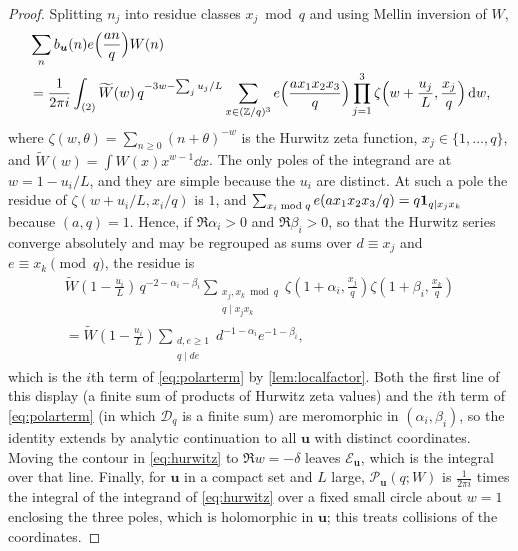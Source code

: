 \documentclass[11pt,colorlinks]{charlie}
\begin{document}
\begin{proof}
Splitting $n_j$ into residue classes $x_j\bmod q$ and using Mellin inversion of $W$,
\begin{equation}\label{eq:hurwitz}
 \begin{split}
 &\sum_nb_{\boldsymbol u}(n)e\Big(\frac{an}q\Big)W(n)\\
 &=\frac1{2\pi i}\int_{(2)}\widetilde W(w)\,q^{-3w-\sum_ju_j/L}\sum_{x\in(\mathbb{Z}/q)^3}e\Big(\frac{ax_1x_2x_3}q\Big)\prod_{j=1}^3\zeta\Big(w+\frac{u_j}L,\frac{x_j}q\Big)\,\mathrm{d} w,
 \end{split}
\end{equation}
where $\zeta(w,\theta)=\sum_{n\ge0}(n+\theta)^{-w}$ is the Hurwitz zeta function, $x_j\in\{1,\dots,q\}$, and $\widetilde W(w)=\int W(x)x^{w-1}\dd x$. The only poles of the integrand are at $w=1-u_i/L$, and they are simple because the $u_i$ are distinct. At such a pole the residue of $\zeta(w+u_i/L,x_i/q)$ is $1$, and $\sum_{x_i\bmod q}e(ax_1x_2x_3/q)=q\mathbf{1}_{q\mid x_jx_k}$ because $(a,q)=1$. Hence, if $\Re\alpha_i>0$ and $\Re\beta_i>0$, so that the Hurwitz series converge absolutely and may be regrouped as sums over $d\equiv x_j$ and $e\equiv x_k\pmod q$, the residue is
\begin{multline*}
 \widetilde W(1-\tfrac{u_i}L)\,q^{-2-\alpha_i-\beta_i}\!\!\sum_{\substack{x_j,x_k\bmod q\\ q\mid x_jx_k}}\!\!\zeta(1+\alpha_i,\tfrac{x_j}q)\zeta(1+\beta_i,\tfrac{x_k}q)\\
 =\widetilde W(1-\tfrac{u_i}L)\sum_{\substack{d,e\ge1\\ q\mid de}}d^{-1-\alpha_i}e^{-1-\beta_i},
\end{multline*}
which is the $i$th term of \eqref{eq:polarterm} by \cref{lem:localfactor}. Both the first line of this display (a finite sum of products of Hurwitz zeta values) and the $i$th term of \eqref{eq:polarterm} (in which $\mathcal D_q$ is a finite sum) are meromorphic in $(\alpha_i,\beta_i)$, so the identity extends by analytic continuation to all $\boldsymbol u$ with distinct coordinates. Moving the contour in \eqref{eq:hurwitz} to $\Re w=-\delta$ leaves $\mathcal E_{\boldsymbol u}$, which is the integral over that line. Finally, for $\boldsymbol u$ in a compact set and $L$ large, $\mathcal P_{\boldsymbol u}(q;W)$ is $\frac1{2\pi i}$ times the integral of the integrand of \eqref{eq:hurwitz} over a fixed small circle about $w=1$ enclosing the three poles, which is holomorphic in $\boldsymbol u$; this treats collisions of the coordinates.
\end{proof}
\end{document}
